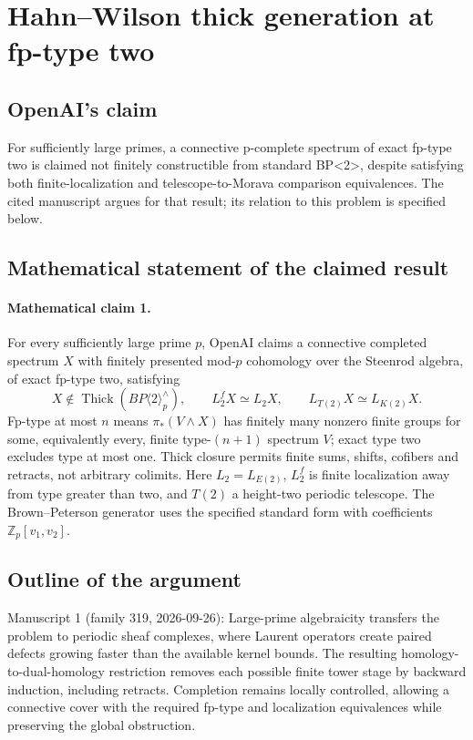 \documentclass[11pt]{article}
\begin{document}
\section*{Hahn–Wilson thick generation at fp-type two}

\subsection{OpenAI's claim}
For sufficiently large primes, a connective p-complete spectrum of exact fp-type two is claimed not finitely constructible from standard BP<2>, despite satisfying both finite-localization and telescope-to-Morava comparison equivalences. The cited manuscript argues for that result; its relation to this problem is specified below.

\subsection{Mathematical statement of the claimed result}
\paragraph{Mathematical claim 1.} For every sufficiently large prime $p$, OpenAI claims a connective completed spectrum $X$ with finitely presented mod-$p$ cohomology over the Steenrod algebra, of exact fp-type two, satisfying
\[
X\notin\operatorname{Thick}(BP\langle2\rangle_p^\wedge),\qquad
L_2^fX\simeq L_2X,\qquad L_{T(2)}X\simeq L_{K(2)}X.
\]
Fp-type at most $n$ means $\pi_*(V\wedge X)$ has finitely many nonzero finite groups for some, equivalently every, finite type-$(n+1)$ spectrum $V$; exact type two excludes type at most one. Thick closure permits finite sums, shifts, cofibers and retracts, not arbitrary colimits. Here $L_2=L_{E(2)}$, $L_2^f$ is finite localization away from type greater than two, and $T(2)$ a height-two periodic telescope. The Brown--Peterson generator uses the specified standard form with coefficients $\mathbb Z_p[v_1,v_2]$.

\subsection{Outline of the argument}
Manuscript 1 (family 319, 2026-09-26): Large-prime algebraicity transfers the problem to periodic sheaf complexes, where Laurent operators create paired defects growing faster than the available kernel bounds. The resulting homology-to-dual-homology restriction removes each possible finite tower stage by backward induction, including retracts. Completion remains locally controlled, allowing a connective cover with the required fp-type and localization equivalences while preserving the global obstruction.
\end{document}

